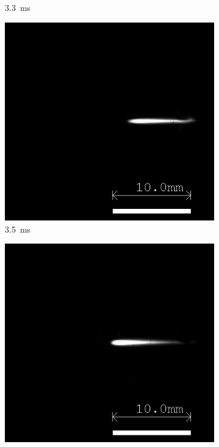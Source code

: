 \begin{figure}[!ht]
\begin{subfigure}[t]{0.3\textwidth}
        \caption{\qty{3.3}{ms}}
    \end{subfigure}
    \hfill
    \begin{subfigure}[t]{0.3\textwidth}
        \centering
        \includegraphics[width=\textwidth]{assets/4 experiments/V1 Spark Ignition Frames/LSP142_SPRK15_Fr35.png}
        \caption{\qty{3.5}{ms}}
    \end{subfigure}
    \begin{subfigure}[t]{0.3\textwidth}
        \centering
        \includegraphics[width=\textwidth]{assets/4 experiments/V1 Spark Ignition Frames/LSP142_SPRK15_Fr38.png}

\end{subfigure}
\end{figure}
